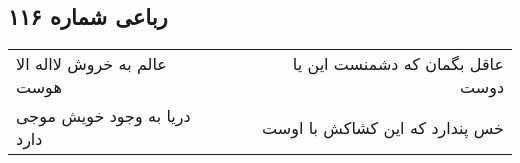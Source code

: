 \begin{center}
\section*{رباعی شماره ۱۱۶}
\label{sec:sh116}
\begin{longtable}{l p{0.5cm} r}
عالم به خروش لااله الا هوست
&&
عاقل بگمان که دشمنست این یا دوست
\\
دریا به وجود خویش موجی دارد
&&
خس پندارد که این کشاکش با اوست
\\
\end{longtable}
\end{center}

